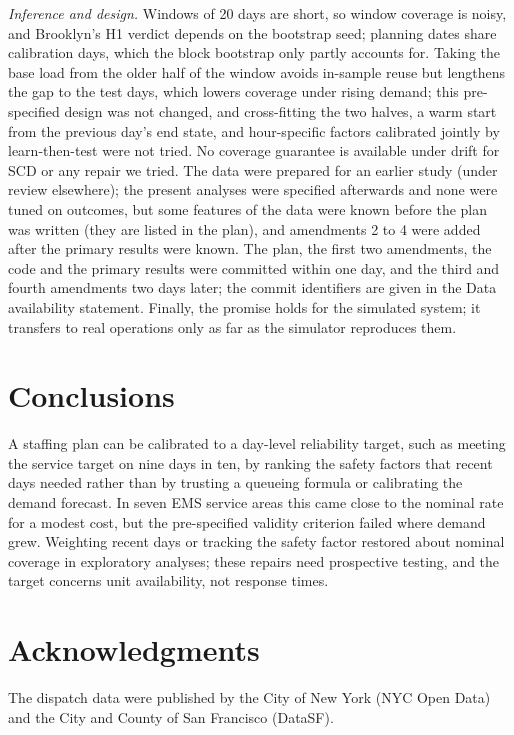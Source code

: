 \documentclass[12pt]{article}
\begin{document}
\emph{Inference and design.} Windows of 20 days are short, so window coverage is noisy, and Brooklyn's H1 verdict depends on the bootstrap seed; planning dates share calibration days, which the block bootstrap only partly accounts for. Taking the base load from the older half of the window avoids in-sample reuse but lengthens the gap to the test days, which lowers coverage under rising demand; this pre-specified design was not changed, and cross-fitting the two halves, a warm start from the previous day's end state, and hour-specific factors calibrated jointly by learn-then-test were not tried. No coverage guarantee is available under drift for SCD or any repair we tried. The data were prepared for an earlier study (under review elsewhere); the present analyses were specified afterwards and none were tuned on outcomes, but some features of the data were known before the plan was written (they are listed in the plan), and amendments 2 to 4 were added after the primary results were known. The plan, the first two amendments, the code and the primary results were committed within one day, and the third and fourth amendments two days later; the commit identifiers are given in the Data availability statement. Finally, the promise holds for the simulated system; it transfers to real operations only as far as the simulator reproduces them.

\section{Conclusions}

A staffing plan can be calibrated to a day-level reliability target, such as meeting the service target on nine days in ten, by ranking the safety factors that recent days needed rather than by trusting a queueing formula or calibrating the demand forecast. In seven EMS service areas this came close to the nominal rate for a modest cost, but the pre-specified validity criterion failed where demand grew. Weighting recent days or tracking the safety factor restored about nominal coverage in exploratory analyses; these repairs need prospective testing, and the target concerns unit availability, not response times.

\section*{Acknowledgments}
The dispatch data were published by the City of New York (NYC Open Data) and the City and County of San Francisco (DataSF).
\end{document}
